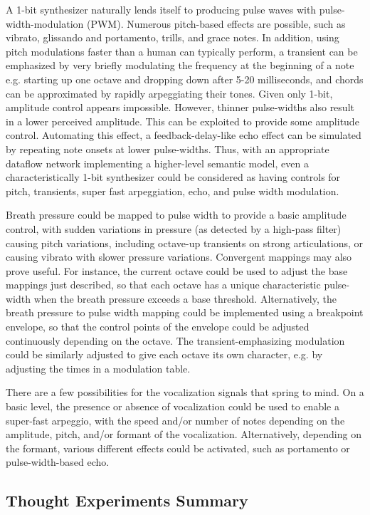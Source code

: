 \documentclass[main.tex]{subfiles}
\begin{document}
A 1-bit synthesizer \cite{troise2020thesis, troise2020_1-bit} naturally lends
itself to producing pulse waves with pulse-width-modulation (PWM). Numerous
pitch-based effects are possible, such as vibrato, glissando and portamento,
trills, and grace notes. In addition, using pitch modulations faster than a
human can typically perform, a transient can be emphasized by very briefly
modulating the frequency at the beginning of a note e.g. starting up one octave
and dropping down after 5-20 milliseconds, and chords can be approximated by
rapidly arpeggiating their tones. Given only 1-bit, amplitude control appears
impossible. However, thinner pulse-widths also result in a lower perceived
amplitude. This can be exploited to provide some amplitude control. Automating
this effect, a feedback-delay-like echo effect can be simulated by repeating
note onsets at lower pulse-widths. Thus, with an appropriate dataflow network
implementing a higher-level semantic model, even a characteristically 1-bit
synthesizer could be considered as having controls for pitch, transients, super
fast arpeggiation, echo, and pulse width modulation.

Breath pressure could be mapped to pulse width to provide a basic amplitude
control, with sudden variations in pressure (as detected by a high-pass filter)
causing pitch variations, including octave-up transients on strong
articulations, or causing vibrato with slower pressure variations. Convergent
mappings may also prove useful. For instance, the current octave could be used
to adjust the base mappings just described, so that each octave has a unique
characteristic pulse-width when the breath pressure exceeds a base threshold.
Alternatively, the breath pressure to pulse width mapping could be implemented
using a breakpoint envelope, so that the control points of the envelope could
be adjusted continuously depending on the octave. The transient-emphasizing
modulation could be similarly adjusted to give each octave its own character,
e.g. by adjusting the times in a modulation table.

There are a few possibilities for the vocalization signals that spring to mind. On
a basic level, the presence or absence of vocalization could be used to enable
a super-fast arpeggio, with the speed and/or number of notes depending on the
amplitude, pitch, and/or formant of the vocalization. Alternatively, depending
on the formant, various different effects could be activated, such as portamento
or pulse-width-based echo.

\subsection{Thought Experiments Summary}
\end{document}

